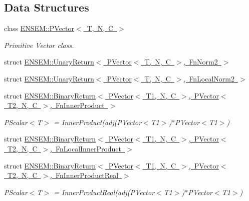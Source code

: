 \subsection*{Data Structures}
\begin{DoxyCompactItemize}
\item 
class \mbox{\hyperlink{classENSEM_1_1PVector}{E\+N\+S\+E\+M\+::\+P\+Vector$<$ T, N, C $>$}}
\begin{DoxyCompactList}\small\item\em Primitive Vector class. \end{DoxyCompactList}\item 
struct \mbox{\hyperlink{structENSEM_1_1UnaryReturn_3_01PVector_3_01T_00_01N_00_01C_01_4_00_01FnNorm2_01_4}{E\+N\+S\+E\+M\+::\+Unary\+Return$<$ P\+Vector$<$ T, N, C $>$, Fn\+Norm2 $>$}}
\item 
struct \mbox{\hyperlink{structENSEM_1_1UnaryReturn_3_01PVector_3_01T_00_01N_00_01C_01_4_00_01FnLocalNorm2_01_4}{E\+N\+S\+E\+M\+::\+Unary\+Return$<$ P\+Vector$<$ T, N, C $>$, Fn\+Local\+Norm2 $>$}}
\item 
struct \mbox{\hyperlink{structENSEM_1_1BinaryReturn_3_01PVector_3_01T1_00_01N_00_01C_01_4_00_01PVector_3_01T2_00_01N_00_a7cabe4dbe0fdb804ad141abb1024477}{E\+N\+S\+E\+M\+::\+Binary\+Return$<$ P\+Vector$<$ T1, N, C $>$, P\+Vector$<$ T2, N, C $>$, Fn\+Inner\+Product $>$}}
\begin{DoxyCompactList}\small\item\em P\+Scalar$<$\+T$>$ = Inner\+Product(adj(\+P\+Vector$<$\+T1$>$)$\ast$\+P\+Vector$<$\+T1$>$) \end{DoxyCompactList}\item 
struct \mbox{\hyperlink{structENSEM_1_1BinaryReturn_3_01PVector_3_01T1_00_01N_00_01C_01_4_00_01PVector_3_01T2_00_01N_00_61a7f4ae3aaa63ae4a0c9c7a3983d045}{E\+N\+S\+E\+M\+::\+Binary\+Return$<$ P\+Vector$<$ T1, N, C $>$, P\+Vector$<$ T2, N, C $>$, Fn\+Local\+Inner\+Product $>$}}
\item 
struct \mbox{\hyperlink{structENSEM_1_1BinaryReturn_3_01PVector_3_01T1_00_01N_00_01C_01_4_00_01PVector_3_01T2_00_01N_00_468475cad5ee6c317874aa2dbdb6c752}{E\+N\+S\+E\+M\+::\+Binary\+Return$<$ P\+Vector$<$ T1, N, C $>$, P\+Vector$<$ T2, N, C $>$, Fn\+Inner\+Product\+Real $>$}}
\begin{DoxyCompactList}\small\item\em P\+Scalar$<$\+T$>$ = Inner\+Product\+Real(adj(\+P\+Vector$<$\+T1$>$)$\ast$\+P\+Vector$<$\+T1$>$) \end{DoxyCompactList}\item 

\end{DoxyCompactItemize}
